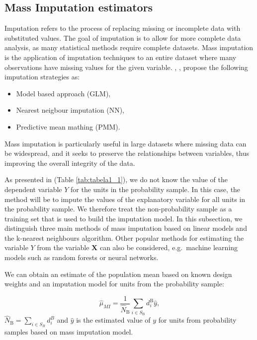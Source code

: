 \documentclass[
]{jss}
\begin{document}
\hypertarget{mass-imputation-estimators}{%
\subsection{Mass Imputation
estimators}\label{mass-imputation-estimators}}

Imputation refers to the process of replacing missing or incomplete data
with substituted values. The goal of imputation is to allow for more
complete data analysis, as many statistical methods require complete
datasets. Mass imputation is the application of imputation techniques to
an entire dataset where many observations have missing values for the
given variable. \cite{kim_combining_2021}, \cite{yang2021integration},
\cite{Beres} propose the following imputation strategies as:

\begin{itemize}
    \item Model based approach (GLM),
    \item Nearest neigbour imputation (NN),
    \item Predictive mean mathing (PMM).
\end{itemize}

Mass imputation is particularly useful in large datasets where missing
data can be widespread, and it seeks to preserve the relationships
between variables, thus improving the overall integrity of the data.

As presented in (Table \ref{tab:tabela1_1}), we do not know the value of
the dependent variable \(Y\) for the units in the probability sample. In
this case, the method will be to impute the values of the explanatory
variable for all units in the probability sample. We therefore treat the
non-probability sample as a training set that is used to build the
imputation model. In this subsection, we distinguish three main methods
of mass imputation based on linear models and the k-nearest neighbours
algorithm. Other popular methods for estimating the variable \(Y\) from
the variable \(\boldsymbol{X}\) can also be considered, e.g.~machine
learning models such as random forests or neural networks.

We can obtain an estimate of the population mean based on known design
weights and an imputation model for units from the probability sample:

\begin{equation}
\hat{\mu}_{M I}=\frac{1}{\hat{N}_{\mathrm{B}}} \sum_{i \in S_{\mathrm{B}}} d_i^{\mathrm{B}} \hat{y}, 
\end{equation} \(\hat{N}_{\mathrm{B}} = \sum_{i \in S_B} d_i^B\) and
\(\hat{y}\) is the estimated value of \(y\) for units from probability
samples based on mass imputation model.
\end{document}
